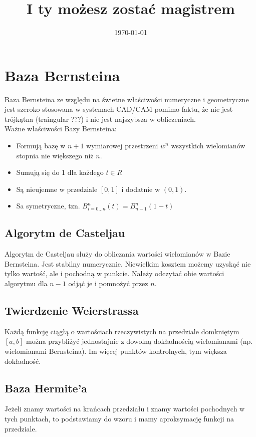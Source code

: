 \documentclass[12pt]{article}
\title{I ty możesz zostać magistrem}
\date{\today}
\begin{document}
	
\maketitle
\tableofcontents

\section{Baza Bernsteina}
Baza Bernsteina ze względu na świetne właściwości numeryczne i geometryczne jest szeroko stosowana w systemach CAD/CAM pomimo faktu, że nie jest trójkątna (traingular ???) i nie jest najszybsza w obliczeniach.\\

Ważne właściwości Bazy Bernsteina:
\begin{itemize}
	\item Formują bazę w $n+1$ wymiarowej przestrzeni $w^{n}$ wszystkich wielomianów stopnia nie większego niż $n$.
	\item Sumują się do 1 dla każdego $t \in R$
	\item Są nieujemne w przedziale $[0,1]$ i dodatnie w $(0,1)$.
	\item Sa symetryczne, tzn. $B^{n}_{i=0...n}(t) = B^{n}_{n-1}(1-t)$
\end{itemize}

\subsection{Algorytm de Casteljau}
Algorytm de Casteljau służy do obliczania wartości wielomianów w Bazie Bernsteina. Jest stabilny numerycznie. 
Niewielkim kosztem możemy uzyskąć nie tylko wartość, ale i pochodną w punkcie. Należy odczytać obie wartości algorytmu dla $n-1$ odjąć je i pomnożyć przez $n$.

\subsection{Twierdzenie Weierstrassa}
Każdą funkcję ciągłą o wartościach rzeczywistych na przedziale domkniętym $[a,b]$ można przybliżyć jednostajnie z dowolną dokładnością wielomianami (np. wielomianami Bernsteina). Im więcej punktów kontrolnych, tym większa dokładność.

\subsection{Baza Hermite'a}
Jeżeli znamy wartości na krańcach przedziału i znamy wartości pochodnych w tych punktach, to podstawiamy do wzoru i mamy aproksymację funkcji na przedziale.
\end{document}
